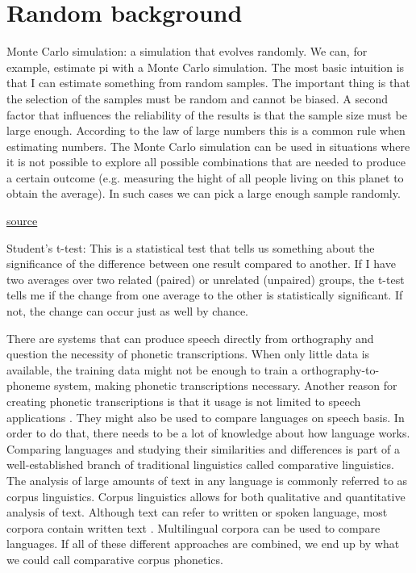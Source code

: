 \section{Random background}
Monte Carlo simulation: a simulation that evolves randomly. We can, for example, estimate pi with a Monte Carlo simulation. The most basic intuition is that I can estimate something from random samples. The important thing is that the selection of the samples must be random and cannot be biased. A second factor that influences the reliability of the results is that the sample size must be large enough. According to the law of large numbers this is a common rule when estimating numbers. The Monte Carlo simulation can be used in situations where it is not possible to explore all possible combinations that are needed to produce a certain outcome (e.g. measuring the hight of all people living on this planet to obtain the average). In such cases we can pick a large enough sample randomly.

\href{https://www.youtube.com/watch?v=7ESK5SaP-bc}{source}

Student's t-test: This is a statistical test that tells us something about the significance of the difference between one result compared to another. If I have two  averages over two related (paired) or unrelated (unpaired) groups, the t-test tells me if the change from one average to the other is statistically significant. If not, the change can occur just as well by chance. 


There are systems that can produce speech directly from orthography and question the necessity of phonetic transcriptions. When only  little data is available, the training data might not be enough to train a orthography-to-phoneme system, making phonetic transcriptions necessary. Another reason for creating phonetic transcriptions is that it usage is not limited to speech applications \citep{mortensen-etal-2018-epitran}. They might also be used to compare languages on speech basis. In order to do that, there needs to be a lot of knowledge about how language works. Comparing languages and studying their similarities and differences is part of a well-established branch of traditional linguistics called comparative linguistics. The analysis of large amounts of text in any language is commonly referred to as corpus linguistics. Corpus linguistics allows for both qualitative and quantitative analysis of text. Although text can refer to written or spoken language, most corpora contain written text \citep{McEnery&Hardie.2011}. Multilingual corpora can be used to compare languages. If all of these different approaches are combined, we end up by what we could call comparative corpus phonetics. 




